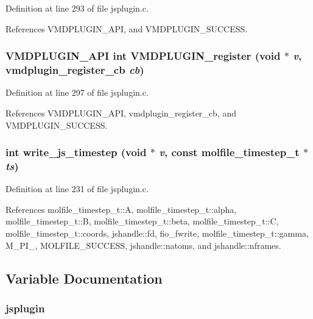 Definition at line 293 of file jsplugin.c.

References VMDPLUGIN\_\-API, and VMDPLUGIN\_\-SUCCESS.
\subsubsection{\setlength{\rightskip}{0pt plus 5cm}VMDPLUGIN\_\-API int VMDPLUGIN\_\-register (void $\ast$ {\em v}, {\bf vmdplugin\_\-register\_\-cb} {\em cb})}\label{jsplugin_8c_a18}




Definition at line 297 of file jsplugin.c.

References VMDPLUGIN\_\-API, vmdplugin\_\-register\_\-cb, and VMDPLUGIN\_\-SUCCESS.
\subsubsection{\setlength{\rightskip}{0pt plus 5cm}int write\_\-js\_\-timestep (void $\ast$ {\em v}, const {\bf molfile\_\-timestep\_\-t} $\ast$ {\em ts})\hspace{0.3cm}{\tt  [static]}}\label{jsplugin_8c_a15}




Definition at line 231 of file jsplugin.c.

References molfile\_\-timestep\_\-t::A, molfile\_\-timestep\_\-t::alpha, molfile\_\-timestep\_\-t::B, molfile\_\-timestep\_\-t::beta, molfile\_\-timestep\_\-t::C, molfile\_\-timestep\_\-t::coords, jshandle::fd, fio\_\-fwrite, molfile\_\-timestep\_\-t::gamma, M\_\-PI\_, MOLFILE\_\-SUCCESS, jshandle::natoms, and jshandle::nframes.

\subsection{Variable Documentation}
\subsubsection{ jsplugin\hspace{0.3cm}{\tt  [static]}}\label{jsplugin_8c_a10}


